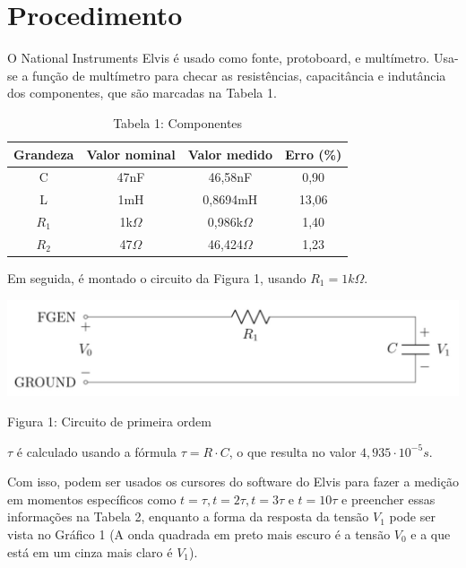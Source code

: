 \documentclass[a4 paper]{article}
\newcommand{\parag}{\hspace{30pt}}
\begin{document}
\newpage
\section{Procedimento}

\parag O National Instruments Elvis é usado como fonte, protoboard, e multímetro. Usa-se a função de multímetro para checar as resistências, capacitância e indutância dos componentes, que são marcadas na Tabela 1.

\vspace{5pt}
\begin{table}[h]
\centering
\begin{tabular}{|c|c|c|c|}
\hline
Grandeza & Valor nominal & Valor medido & Erro (\%) \\\hline
C & 47nF & 46,58nF & 0,90\\    \hline
L & 1mH & 0,8694mH & 13,06\\    \hline
$R_1$ & 1k$\Omega$ & 0,986k$\Omega$ & 1,40\\\hline
$R_2$ & 47$\Omega$ & 46,424$\Omega$ & 1,23\\\hline
\end{tabular}
\caption*{Tabela 1: Componentes}
\end{table}

Em seguida, é montado o circuito da Figura 1, usando $R_1=1k\Omega$.

\begin{table}[h]
\centering
\includegraphics[scale=0.3]{figuras/figura1}
\end{table}

\begin{center}
Figura 1: Circuito de primeira ordem
\end{center}

$\tau$ é calculado usando a fórmula $\tau = R\cdot C$, o que resulta no valor $4,935\cdot10^{-5}s$.

Com isso, podem ser usados os cursores do software do Elvis para fazer a medição em momentos específicos como $t=\tau, t=2\tau, t=3\tau$ e $t=10\tau$ e preencher essas informações na Tabela 2, enquanto a forma da resposta da tensão $V_1$ pode ser vista no Gráfico 1 (A onda quadrada em preto mais escuro é a tensão $V_0$ e a que está em um cinza mais claro é $V_1$).
\end{document}
